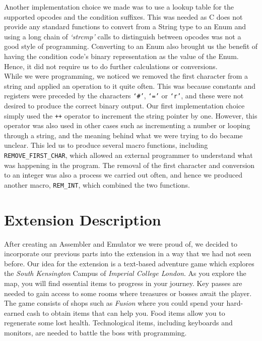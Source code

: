 \documentclass[10pt]{article}
\begin{document}
Another implementation choice we made was to use a lookup table for the supported opcodes and the condition suffixes. This was needed as C does not provide any standard functions to convert from a String type to an Enum and using a long chain of {\sl ‘strcmp’} calls to distinguish between opcodes was not a good style of programming. Converting to an Enum also brought us the benefit of having the condition code’s binary representation as the value of the Enum. Hence, it did not require us to do further calculations or conversions. 
\\

While we were programming, we noticed we removed the first character from a string and applied an operation to it quite often. This was because constants and registers were preceded by the characters {\tt ‘\#’}, {\tt ‘=’} or {\tt ‘r’}, and these were not desired to produce the correct binary output. Our first implementation choice simply used the {\tt ++} operator to increment the string pointer by one. However, this operator was also used in other cases such as incrementing a number or looping through a string, and the meaning behind what we were trying to do became unclear. This led us to produce several macro functions, including  {\tt REMOVE\_FIRST\_CHAR}, which allowed an external programmer to understand what was happening in the program. The removal of the first character and conversion to an integer was also a process we carried out often, and hence we produced another macro, {\tt REM\_INT}, which combined the two functions. 

\section*{Extension Description}

After creating an Assembler and Emulator we were proud of, we decided to incorporate our previous parts into the extension in a way that we had not seen before. Our idea for the extension is a text-based adventure game which explores the {\sl South Kensington} Campus of {\sl Imperial College London}. As you explore the map, you will find essential items to progress in your journey. Key passes are needed to gain access to some rooms where treasures or bosses await the player. The game consists of shops such as {\sl Fusion} where you could spend your hard-earned cash to obtain items that can help you. Food items allow you to regenerate some lost health. Technological items, including keyboards and monitors, are needed to battle the boss with programming.
\\
\end{document}
